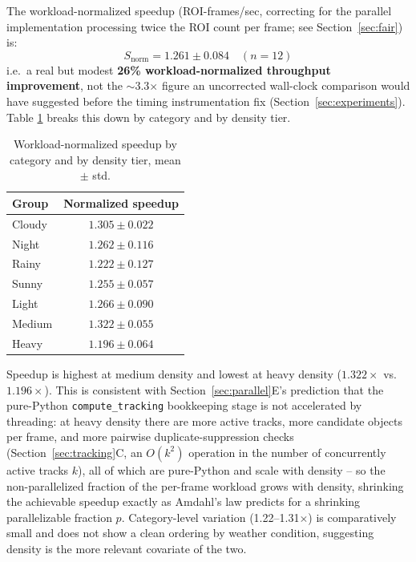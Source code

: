 \documentclass[conference]{IEEEtran}
\newcommand{\code}[1]{\texttt{#1}}
\begin{document}
The workload-normalized speedup (ROI-frames/sec, correcting for the
parallel implementation processing twice the ROI count per frame; see
Section~\ref{sec:fair}) is:
\begin{equation}
S_{\text{norm}} = 1.261 \pm 0.084 \quad (n=12)
\label{eq:measured-speedup}
\end{equation}
i.e.\ a real but modest \textbf{26\% workload-normalized throughput
improvement}, not the $\sim$3.3$\times$ figure an uncorrected
wall-clock comparison would have suggested before the timing
instrumentation fix (Section~\ref{sec:experiments}). Table
\ref{tab:speedup-breakdown} breaks this down by category and by density
tier.

\begin{table}[t]
\centering
\caption{Workload-normalized speedup by category and by density tier,
mean $\pm$ std.}
\label{tab:speedup-breakdown}
\footnotesize
\begin{tabular}{lc}
\toprule
\textbf{Group} & \textbf{Normalized speedup} \\
\midrule
Cloudy & $1.305 \pm 0.022$ \\
Night  & $1.262 \pm 0.116$ \\
Rainy  & $1.222 \pm 0.127$ \\
Sunny  & $1.255 \pm 0.057$ \\
\midrule
Light  & $1.266 \pm 0.090$ \\
Medium & $1.322 \pm 0.055$ \\
Heavy  & $1.196 \pm 0.064$ \\
\bottomrule
\end{tabular}
\end{table}

Speedup is highest at medium density and lowest at heavy density
($1.322\times$ vs.\ $1.196\times$). This is consistent with
Section~\ref{sec:parallel}E's prediction that the pure-Python
\code{compute\_tracking} bookkeeping stage is not accelerated by
threading: at heavy density there are more active tracks, more
candidate objects per frame, and more pairwise duplicate-suppression
checks (Section~\ref{sec:tracking}C, an $O(k^2)$ operation in the number
of concurrently active tracks $k$), all of which are pure-Python and
scale with density -- so the non-parallelized fraction of the per-frame
workload grows with density, shrinking the achievable speedup exactly
as Amdahl's law predicts for a shrinking parallelizable fraction $p$.
Category-level variation (1.22--1.31$\times$) is comparatively small and
does not show a clean ordering by weather condition, suggesting density
is the more relevant covariate of the two.
\end{document}
